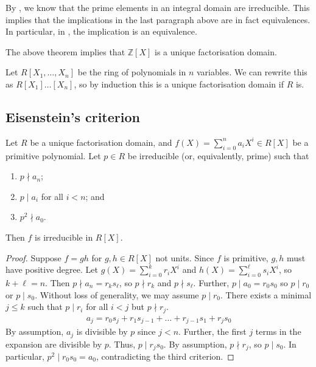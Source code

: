 \begin{remark}
	By , we know that the prime elements in an integral domain are irreducible.
	This implies that the implications in the last paragraph above are in fact equivalences.
	In particular, in , the implication is an equivalence.
\end{remark}

\begin{example}
	The above theorem implies that $\mathbb Z[X]$ is a unique factorisation domain.

	Let $R[X_1, \dots, X_n]$ be the ring of polynomials in $n$ variables.
	We can rewrite this as $R[X_1]\dots[X_n]$, so by induction this is a unique factorisation domain if $R$ is.
\end{example}

\subsection{Eisenstein's criterion}
\begin{proposition}
	Let $R$ be a unique factorisation domain, and $f(X) = \sum_{i=0}^n a_i X^i \in R[X]$ be a primitive polynomial.
	Let $p \in R$ be irreducible (or, equivalently, prime) such that
	\begin{enumerate}
		\item $p \nmid a_n$;
		\item $p \mid a_i$ for all $i < n$; and
		\item $p^2 \nmid a_0$.
	\end{enumerate}
	Then $f$ is irreducible in $R[X]$.
\end{proposition}
\begin{proof}
	Suppose $f = gh$ for $g,h \in R[X]$ not units.
	Since $f$ is primitive, $g, h$ must have positive degree.
	Let $g(X) = \sum_{i=0}^k r_i X^i$ and $h(X) = \sum_{i=0}^\ell s_i X^i$, so $k + \ell = n$.
	Then $p \nmid a_n = r_k s_\ell$, so $p \nmid r_k$ and $p \nmid s_\ell$.
	Further, $p \mid a_0 = r_0 s_0$ so $p \mid r_0$ or $p \mid s_0$.
	Without loss of generality, we may assume $p \mid r_0$.
	There exists a minimal $j \leq k$ such that $p \mid r_i$ for all $i < j$ but $p \nmid r_j$.
	\begin{align*}
		a_j = r_0 s_j + r_1 s_{j-1} + \dots + r_{j-1} s_1 + r_j s_0
	\end{align*}
	By assumption, $a_j$ is divisible by $p$ since $j < n$.
	Further, the first $j$ terms in the expansion are divisible by $p$.
	Thus, $p \mid r_j s_0$.
	By assumption, $p \nmid r_j$, so $p \mid s_0$.
	In particular, $p^2 \mid r_0 s_0 = a_0$, contradicting the third criterion.
\end{proof}
